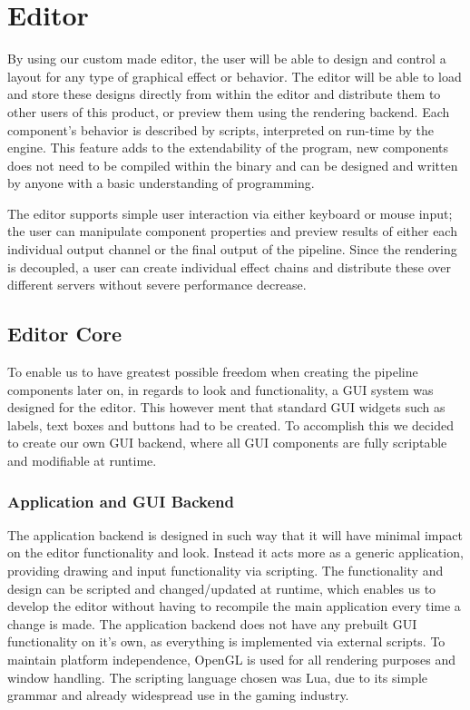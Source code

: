 
\chapter{Editor}
 
By using our custom made editor, the user will be able to design and control a layout for any type of graphical effect or behavior. 
The editor will be able to load and store these designs directly from within the editor and distribute them to other users of this product, or preview them using the rendering backend. 
Each component’s behavior is described by scripts, interpreted on run-time by the engine. This feature adds to the extendability of the program, new components does not need to be compiled within the binary and can be designed and written by anyone with a basic understanding of programming.

The editor supports simple user interaction via either keyboard or mouse input; the user can manipulate component properties and preview results of either each individual output channel or the final output of the pipeline. Since the rendering is decoupled, a user can create individual effect chains and distribute these over different servers without severe performance decrease. 

\section{Editor Core}
To enable us to have greatest possible freedom when creating the pipeline components later on, in regards to look and functionality, a GUI system was designed for the editor.
This however ment that standard GUI widgets such as labels, text boxes and buttons had to be created. To accomplish this we decided to create our own GUI backend, where all GUI components are fully scriptable and modifiable at runtime. 

\subsection{Application and GUI Backend}
The application backend is designed in such way that it will have minimal impact on the editor functionality and look. Instead it acts more as a generic application, providing drawing and input functionality via scripting. The functionality and design can be scripted and changed/updated at runtime, which enables us to develop the editor without having to recompile the main application every time a change is made. The application backend does not have any prebuilt GUI functionality on it's own, as everything is implemented via external scripts. To maintain platform independence, OpenGL is used for all rendering purposes and window handling. The scripting language chosen was Lua, due to its simple grammar and already widespread use in the gaming industry.


